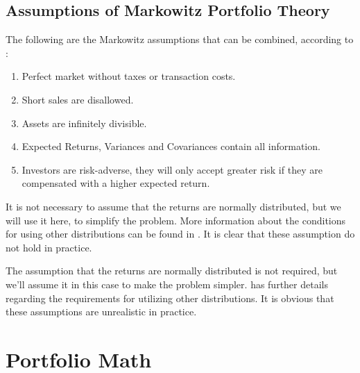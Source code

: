 \documentclass[
  oneside]{book}
\begin{document}
\hypertarget{assumptions-of-markowitz-portfolio-theory}{%
\subsection{Assumptions of Markowitz Portfolio Theory}\label{assumptions-of-markowitz-portfolio-theory}}

The following are the Markowitz assumptions that can be combined, according to \citep{Mari2005}:

\begin{enumerate}
    \item Perfect market without taxes or transaction costs.
    \item Short sales are disallowed.
    \item Assets are infinitely divisible.
    \item Expected Returns, Variances and Covariances contain all information.
    \item Investors are risk-adverse, they will only accept greater risk if they
are compensated with a higher expected return.
\end{enumerate}

It is not necessary to assume that the returns are normally distributed, but we will use it here, to simplify the problem. More information about the conditions for using other distributions can be found in \citep{Mari2005}. It is clear that these assumption do not hold in practice.

The assumption that the returns are normally distributed is not required, but we'll assume it in this case to make the problem simpler. \citep{Mari2005} has further details regarding the requirements for utilizing other distributions. It is obvious that these assumptions are unrealistic in practice.

\hypertarget{portfolio-math}{%
\section{Portfolio Math}\label{portfolio-math}}
\end{document}
